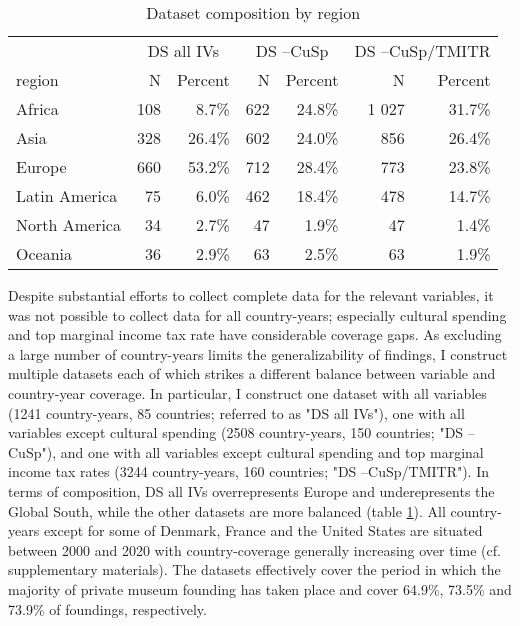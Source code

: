 \documentclass[11pt]{article}
\begin{document}
\begin{table}[ht]
\centering
\begin{tabular}{p{2.5cm}rrrrrr}
  \hline 
 & \multicolumn{2}{c}{DS all IVs} & \multicolumn{2}{c}{DS --CuSp} & \multicolumn{2}{c}{DS --CuSp/TMITR} \\ 
\cmidrule(r){2-3}\cmidrule(r){4-5}\cmidrule(r){6-7} 
 region & N & Percent & N & Percent & N & Percent \\ 
  \hline
Africa & 108 &  8.7\% & 622 & 24.8\% & 1 027 & 31.7\% \\ 
  Asia & 328 & 26.4\% & 602 & 24.0\% & 856 & 26.4\% \\ 
  Europe & 660 & 53.2\% & 712 & 28.4\% & 773 & 23.8\% \\ 
  Latin America & 75 &  6.0\% & 462 & 18.4\% & 478 & 14.7\% \\ 
  North America & 34 &  2.7\% & 47 &  1.9\% & 47 &  1.4\% \\ 
  Oceania & 36 &  2.9\% & 63 &  2.5\% & 63 &  1.9\% \\ 
   \hline
\end{tabular}
\caption{Dataset composition by region} 
\label{tbl:cbn_cpsgn}
\end{table}
Despite substantial efforts to collect complete data for the relevant variables, it was not possible to collect data for all country-years; especially cultural spending and top marginal income tax rate have considerable coverage gaps.
As excluding a large number of country-years limits the generalizability of findings, I construct multiple datasets each of which strikes a different balance between variable and country-year coverage.
In particular, I construct one dataset with all variables (1241 country-years, 85 countries; referred to as "DS all IVs"), one with all variables except cultural spending (2508 country-years, 150 countries; "DS --CuSp"), and one with all variables except cultural spending and top marginal income tax rates (3244 country-years, 160 countries; "DS --CuSp/TMITR").
In terms of composition, DS all IVs overrepresents Europe and underepresents the Global South, while the other datasets are more balanced (table \ref{tbl:cbn_cpsgn}).
All country-years except for some of Denmark, France and the United States are situated between 2000 and 2020 with country-coverage generally increasing over time (cf. supplementary materials).
The datasets effectively cover the period in which the majority of private museum founding has taken place and cover 64.9\%, 73.5\% and 73.9\% of foundings, respectively.
\end{document}
